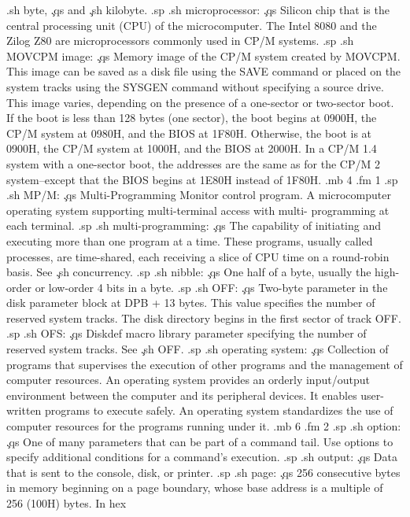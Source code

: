 .sh
byte, \c
.qs
and \c
.sh
kilobyte.
.sp
.sh
microprocessor:  \c
.qs
Silicon chip that is the central processing unit (CPU) of the 
microcomputer.  The Intel 8080 and the Zilog Z80 are 
microprocessors commonly used in CP/M systems.
.sp
.sh
MOVCPM image:  \c
.qs
Memory image of the CP/M system created by MOVCPM.  This image 
can be saved as a disk file using the SAVE command or placed on 
the system tracks using the SYSGEN command without specifying a 
source drive.  This image varies, depending on the presence of a 
one-sector or two-sector boot.  If the boot is less than 128 
bytes (one sector), the boot begins at 0900H, the CP/M system at 
0980H, and the BIOS at 1F80H.  Otherwise, the boot is at 0900H, 
the CP/M system at 1000H, and the BIOS at 2000H.  In a CP/M 1.4 
system with a one-sector boot, the addresses are the same as for 
the CP/M 2 system--except that the BIOS begins at 1E80H instead 
of 1F80H.
.mb 4
.fm 1
.sp
.sh
MP/M:  \c
.qs
Multi-Programming Monitor control program.  A microcomputer 
operating system supporting multi-terminal access with multi-
programming at each terminal.
.sp
.sh
multi-programming:  \c
.qs
The capability of initiating and executing more than one program 
at a time.  These programs, usually called processes, are time-shared,
each receiving a slice of CPU time on a round-robin 
basis.  See \c
.sh
concurrency.
.sp
.sh
nibble:  \c
.qs
One half of a byte, usually the high-order or low-order 4 bits in 
a byte.
.sp
.sh
OFF:  \c
.qs
Two-byte parameter in the disk parameter block at DPB + 13 bytes.  
This value specifies the number of reserved system tracks.  The 
disk directory begins in the first sector of track OFF.
.sp
.sh
OFS:  \c
.qs
Diskdef macro library parameter specifying the number of reserved 
system tracks.  See \c
.sh
OFF.
.sp
.sh
operating system:  \c
.qs
Collection of programs that supervises the execution of other 
programs and the management of computer resources.  An operating 
system provides an orderly input/output environment between the 
computer and its peripheral devices.  It enables user-written 
programs to execute safely.  An operating system standardizes the 
use of computer resources for the programs running under it.
.mb 6
.fm 2
.sp
.sh
option:  \c
.qs
One of many parameters that can be part of a command tail.  Use 
options to specify additional conditions for a command's 
execution.
.sp
.sh
output:  \c
.qs
Data that is sent to the console, disk, or printer.
.sp
.sh
page:  \c
.qs
256 consecutive bytes in memory beginning on a page boundary, 
whose base address is a multiple of 256 (100H) bytes.  In hex 
